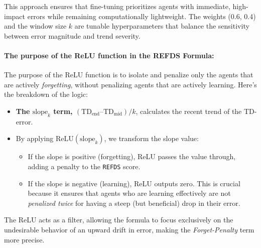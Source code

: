 This approach ensures that fine-tuning prioritizes agents with immediate, high-impact errors while remaining computationally lightweight. The weights (0.6, 0.4) and the window size $k$ are tunable hyperparameters that balance the sensitivity between error magnitude and trend severity.



\paragraph{The purpose of the ReLU function in the REFDS Formula: }
The purpose of the ReLU function is to isolate and penalize only the agents that are actively \textit{forgetting}, without penalizing agents that are actively learning.
Here's the breakdown of the logic:
\begin{itemize}
    \item \textbf{The $\text{slope}_k$ term, $(\text{TD}_{\text{end}} – \text{TD}_{\text{mid}}) / k$}, calculates the recent trend of the TD-error.
   \item By applying $\text{ReLU}(\text{slope}_k)$, we transform the slope value:
\begin{itemize}
    \item If the slope is positive (forgetting), ReLU passes the value through, adding a penalty to the \texttt{REFDS} score.
    \item If the slope is negative (learning), ReLU outputs zero. This is crucial because it ensures that agents who are learning effectively are not \textit{penalized twice} for having a steep (but beneficial) drop in their error.
\end{itemize}
\end{itemize}
The ReLU acts as a filter, allowing the formula to focus exclusively on the undesirable behavior of an upward drift in error, making the \textit{Forget-Penalty} term more precise.
